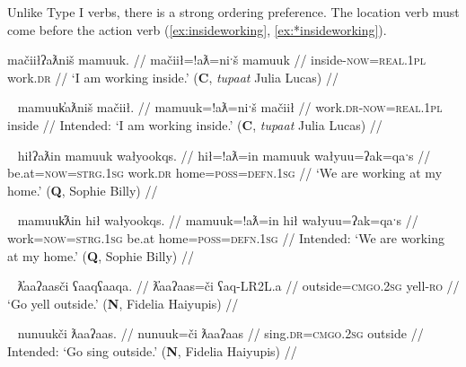 Unlike Type I verbs, there is a strong ordering preference. The location verb must come before the action verb (\ref{ex:insideworking}, \ref{ex:*insideworking}). 

\ex \label{ex:insideworking}
\begingl
\glpreamble mačiiłʔaƛniš mamuuk. //
\gla mačiił=!aƛ=niˑš mamuuk  //
\glb inside-\textsc{now}=\textsc{real.1pl} work.\textsc{dr} //
\glft `I am working inside.' (\textbf{C}, \textit{tupaat} Julia Lucas) //
\endgl
\xe

\ex~ \label{ex:*insideworking}
\begingl
\glpreamble *mamuuk̓aƛniš mačiił. //
\gla mamuuk=!aƛ=niˑš mačiił //
\glb work.\textsc{dr}-\textsc{now}=\textsc{real.1pl} inside //
\glft Intended: `I am working inside.' (\textbf{C}, \textit{tupaat} Julia Lucas) //
\endgl
\xe

\ex~ \label{ex:workathome}
\begingl
\glpreamble hiłʔaƛin mamuuk wałyookqs. //
\gla hił=!aƛ=in mamuuk wałyuu=ʔak=qaˑs  //
\glb be.at=\textsc{now}=\textsc{strg.1sg} work.\textsc{dr} home=\textsc{poss}=\textsc{defn.1sg} //
\glft `We are working at my home.' (\textbf{Q}, Sophie Billy) //
\endgl
\xe

\ex~ \label{ex:*workathome}
\begingl
\glpreamble *mamuuk̓ƛin hił wałyookqs. //
\gla mamuuk=!aƛ=in hił wałyuu=ʔak=qaˑs  //
\glb work=\textsc{now}=\textsc{strg.1sg} be.at home=\textsc{poss}=\textsc{defn.1sg} //
\glft Intended: `We are working at my home.' (\textbf{Q}, Sophie Billy) //
\endgl
\xe

\ex~ \label{ex:shoutoutside}
\begingl
\glpreamble ƛ̓aaʔaasči ʕaaqʕaaqa. //
\gla ƛ̓aaʔaas=či ʕaq-LR2L.a  //
\glb outside=\textsc{cmgo.2sg} yell-\textsc{ro} //
\glft `Go yell outside.' (\textbf{N}, Fidelia Haiyupis) //
\endgl
\xe

\ex~ \label{ex:*singoutside}
\begingl
\glpreamble *nunuukči ƛaaʔaas. //
\gla nunuuk=či ƛaaʔaas  //
\glb sing.\textsc{dr}=\textsc{cmgo.2sg} outside //
\glft Intended: `Go sing outside.'\footnotemark{} (\textbf{N}, Fidelia Haiyupis) //
\endgl
\xe



